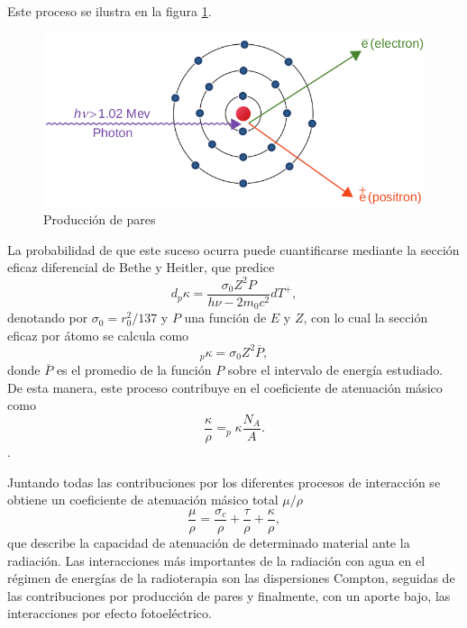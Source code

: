 Este proceso se ilustra en la figura \ref{fig:Pares}.\\
\begin{figure}[H]
	\centering
	\includegraphics[width=0.7\linewidth]{images/produccionPares.png}
	\caption{Producción de pares}
	\label{fig:Pares}
\end{figure}

La probabilidad de que este suceso ocurra puede cuantificarse mediante la sección eficaz diferencial de Bethe y Heitler, que predice 
\begin{equation}
	d_{p}\kappa=\frac{\sigma_0 Z^2 P}{h\nu -2m_0c^2}dT^{+}, 
\end{equation}
denotando por $\sigma_0=r_{0}^2/137$ y $P$ una función de $E$ y $Z$, con lo cual la sección eficaz por átomo se calcula como
\begin{equation}
	_{p}\kappa=\sigma_0Z^2\overline{P},
\end{equation}
donde $\overline{P}$ es el promedio de la función $P$ sobre el intervalo de energía estudiado.\\

De esta manera, este proceso contribuye en el coeficiente de atenuación másico como
\begin{equation}
	\frac{\kappa}{\rho}=_{p}\kappa\frac{N_A}{A}.
\end{equation}.

Juntando todas las contribuciones por los diferentes procesos de interacción se obtiene un coeficiente de atenuación másico total $\mu/\rho$
\begin{equation}
	\frac{\mu}{\rho}=\frac{\sigma_c}{\rho}+\frac{\tau}{\rho}+\frac{\kappa}{\rho},
\end{equation}
que describe la capacidad de atenuación de determinado material ante la radiación. Las interacciones más importantes de la radiación con agua en el régimen de energías de la radioterapia son las dispersiones Compton, seguidas de las contribuciones por producción de pares y finalmente, con un aporte bajo, las interacciones por efecto fotoeléctrico.  \\

